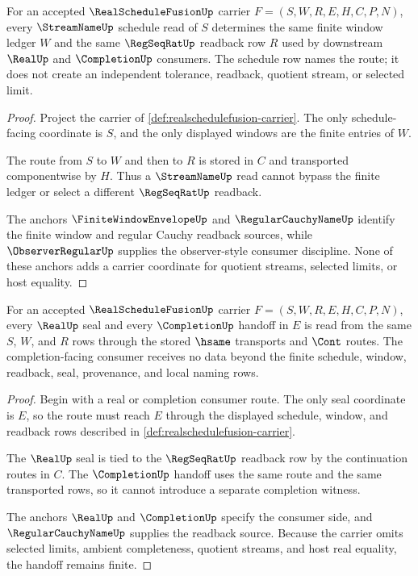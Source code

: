 \begin{theorem}
\label{thm:realschedulefusion-streamname-regseqrat-lock}
For an accepted $\RealScheduleFusionUp$ carrier $F=(S,W,R,E,H,C,P,N)$, every $\StreamNameUp$ schedule read of $S$ determines the same finite window ledger $W$ and the same $\RegSeqRatUp$ readback row $R$ used by downstream $\RealUp$ and $\CompletionUp$ consumers. The schedule row names the route; it does not create an independent tolerance, readback, quotient stream, or selected limit.
\end{theorem}
\begin{proof}
Project the carrier of \autoref{def:realschedulefusion-carrier}. The only schedule-facing coordinate is $S$, and the only displayed windows are the finite entries of $W$.

The route from $S$ to $W$ and then to $R$ is stored in $C$ and transported componentwise by $H$. Thus a $\StreamNameUp$ read cannot bypass the finite ledger or select a different $\RegSeqRatUp$ readback.

The anchors $\FiniteWindowEnvelopeUp$ and $\RegularCauchyNameUp$ identify the finite window and regular Cauchy readback sources, while $\ObserverRegularUp$ supplies the observer-style consumer discipline. None of these anchors adds a carrier coordinate for quotient streams, selected limits, or host equality.
\end{proof}

\begin{theorem}
\label{thm:realschedulefusion-real-completion-handoff}
For an accepted $\RealScheduleFusionUp$ carrier $F=(S,W,R,E,H,C,P,N)$, every $\RealUp$ seal and every $\CompletionUp$ handoff in $E$ is read from the same $S$, $W$, and $R$ rows through the stored $\hsame$ transports and $\Cont$ routes. The completion-facing consumer receives no data beyond the finite schedule, window, readback, seal, provenance, and local naming rows.
\end{theorem}
\begin{proof}
Begin with a real or completion consumer route. The only seal coordinate is $E$, so the route must reach $E$ through the displayed schedule, window, and readback rows described in \autoref{def:realschedulefusion-carrier}.

The $\RealUp$ seal is tied to the $\RegSeqRatUp$ readback row by the continuation routes in $C$. The $\CompletionUp$ handoff uses the same route and the same transported rows, so it cannot introduce a separate completion witness.

The anchors $\RealUp$ and $\CompletionUp$ specify the consumer side, and $\RegularCauchyNameUp$ supplies the readback source. Because the carrier omits selected limits, ambient completeness, quotient streams, and host real equality, the handoff remains finite.
\end{proof}

